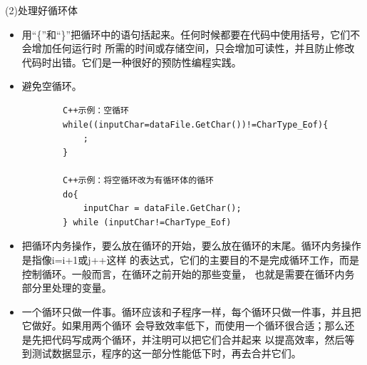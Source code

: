 \documentclass{article}
\begin{document}
\par
(2)处理好循环体
\par
\begin{itemize}
    \item 用“\{”和“\}”把循环中的语句括起来。任何时候都要在代码中使用括号，它们不会增加任何运行时
    所需的时间或存储空间，只会增加可读性，并且防止修改代码时出错。它们是一种很好的预防性编程实践。
    \item 避免空循环。
    \begin{lstlisting}
        C++示例：空循环
        while((inputChar=dataFile.GetChar())!=CharType_Eof){
            ;
        }

        C++示例：将空循环改为有循环体的循环
        do{
            inputChar = dataFile.GetChar();
        } while (inputChar!=CharType_Eof)
    \end{lstlisting}
    \item 把循环内务操作，要么放在循环的开始，要么放在循环的末尾。循环内务操作是指像i=i+1或j++这样
    的表达式，它们的主要目的不是完成循环工作，而是控制循环。一般而言，在循环之前开始的那些变量，
    也就是需要在循环内务部分里处理的变量。
    \item 一个循环只做一件事。循环应该和子程序一样，每个循环只做一件事，并且把它做好。如果用两个循环
    会导致效率低下，而使用一个循环很合适；那么还是先把代码写成两个循环，并注明可以把它们合并起来
    以提高效率，然后等到测试数据显示，程序的这一部分性能低下时，再去合并它们。
\end{itemize}
\end{document}

